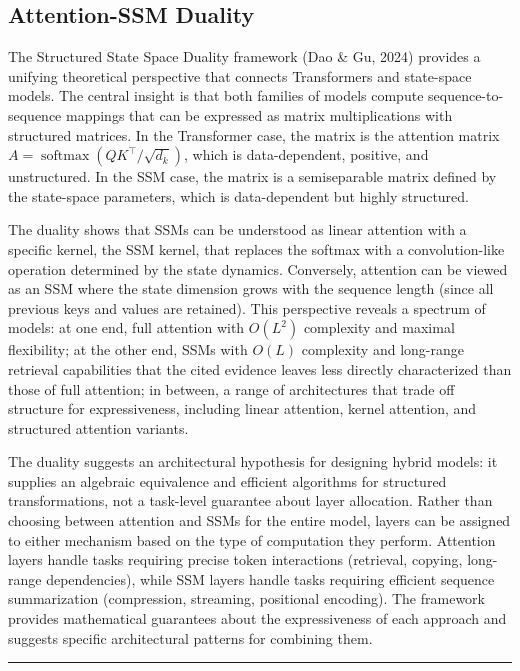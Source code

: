 \documentclass[10pt,twocolumn]{article}
\begin{document}
\subsection{Attention-SSM Duality}\label{attention-ssm-duality}

The Structured State Space Duality framework (Dao \& Gu, 2024) provides a unifying theoretical perspective that connects Transformers and state-space models. The central insight is that both families of models compute sequence-to-sequence mappings that can be expressed as matrix multiplications with structured matrices. In the Transformer case, the matrix is the attention matrix $A=\operatorname{softmax}(QK^{\top}/\sqrt{d_k})$, which is data-dependent, positive, and unstructured. In the SSM case, the matrix is a semiseparable matrix defined by the state-space parameters, which is data-dependent but highly structured.

The duality shows that SSMs can be understood as linear attention with a specific kernel, the SSM kernel, that replaces the softmax with a convolution-like operation determined by the state dynamics. Conversely, attention can be viewed as an SSM where the state dimension grows with the sequence length (since all previous keys and values are retained). This perspective reveals a spectrum of models: at one end, full attention with $O(L^2)$ complexity and maximal flexibility; at the other end, SSMs with $O(L)$ complexity and long-range retrieval capabilities that the cited evidence leaves less directly characterized than those of full attention; in between, a range of architectures that trade off structure for expressiveness, including linear attention, kernel attention, and structured attention variants.

The duality suggests an architectural hypothesis for designing hybrid models: it supplies an algebraic equivalence and efficient algorithms for structured transformations, not a task-level guarantee about layer allocation. Rather than choosing between attention and SSMs for the entire model, layers can be assigned to either mechanism based on the type of computation they perform. Attention layers handle tasks requiring precise token interactions (retrieval, copying, long-range dependencies), while SSM layers handle tasks requiring efficient sequence summarization (compression, streaming, positional encoding). The framework provides mathematical guarantees about the expressiveness of each approach and suggests specific architectural patterns for combining them.

\begin{center}\rule{0.5\linewidth}{0.5pt}\end{center}
\end{document}
